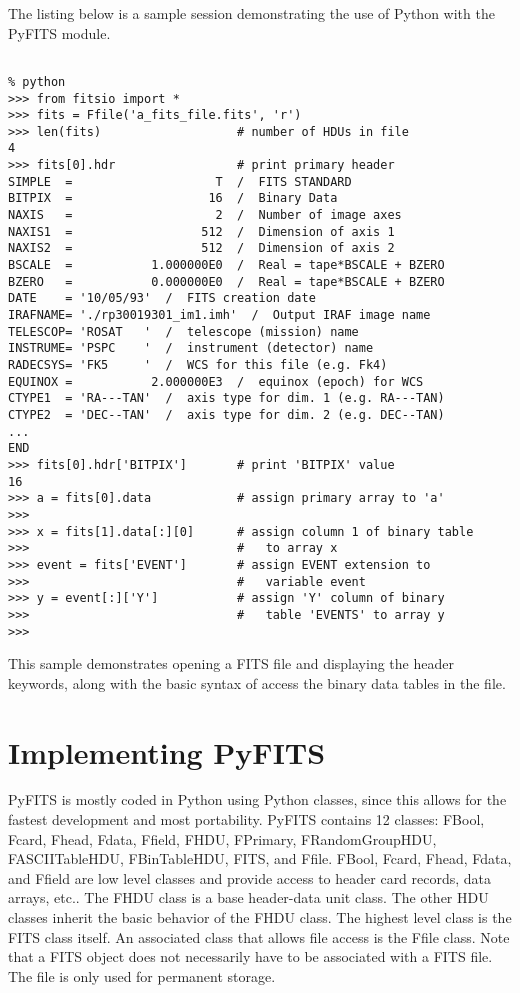 The listing below is a sample session demonstrating the use of Python 
with the PyFITS module.


\begin{verbatim}

% python
>>> from fitsio import *
>>> fits = Ffile('a_fits_file.fits', 'r')
>>> len(fits)                   # number of HDUs in file
4
>>> fits[0].hdr                 # print primary header
SIMPLE  =                    T  /  FITS STANDARD                           
BITPIX  =                   16  /  Binary Data                             
NAXIS   =                    2  /  Number of image axes                    
NAXIS1  =                  512  /  Dimension of axis 1                     
NAXIS2  =                  512  /  Dimension of axis 2                     
BSCALE  =           1.000000E0  /  Real = tape*BSCALE + BZERO              
BZERO   =           0.000000E0  /  Real = tape*BSCALE + BZERO              
DATE    = '10/05/93'  /  FITS creation date                                
IRAFNAME= './rp30019301_im1.imh'  /  Output IRAF image name                
TELESCOP= 'ROSAT   '  /  telescope (mission) name                          
INSTRUME= 'PSPC    '  /  instrument (detector) name                        
RADECSYS= 'FK5     '  /  WCS for this file (e.g. Fk4)                      
EQUINOX =           2.000000E3  /  equinox (epoch) for WCS                 
CTYPE1  = 'RA---TAN'  /  axis type for dim. 1 (e.g. RA---TAN)              
CTYPE2  = 'DEC--TAN'  /  axis type for dim. 2 (e.g. DEC--TAN)              
...
END 
>>> fits[0].hdr['BITPIX']       # print 'BITPIX' value
16
>>> a = fits[0].data            # assign primary array to 'a'
>>> 
>>> x = fits[1].data[:][0]      # assign column 1 of binary table
>>>                             #   to array x
>>> event = fits['EVENT']       # assign EVENT extension to 
>>>                             #   variable event
>>> y = event[:]['Y']           # assign 'Y' column of binary 
>>>                             #   table 'EVENTS' to array y
>>> 
\end{verbatim}

This sample demonstrates opening a FITS file and displaying the header 
keywords, along with the basic syntax of access the binary data tables 
in the file.

\section{Implementing PyFITS}

PyFITS is mostly coded in Python using Python classes, since this
allows for the fastest development and most portability.  PyFITS
contains 12 classes: FBool, Fcard, Fhead, Fdata, Ffield, FHDU,
FPrimary, FRandomGroupHDU, FASCIITableHDU, FBinTableHDU, FITS, and
Ffile.  FBool, Fcard, Fhead, Fdata, and Ffield are low level classes
and provide access to header card records, data arrays, etc..  The
FHDU class is a base header-data unit class.  The other HDU classes
inherit the basic behavior of the FHDU class.  The highest level class
is the FITS class itself.  An associated class that allows file access
is the Ffile class.  Note that a FITS object does not necessarily have 
to be associated with a FITS file.  The file is only used for
permanent storage.

